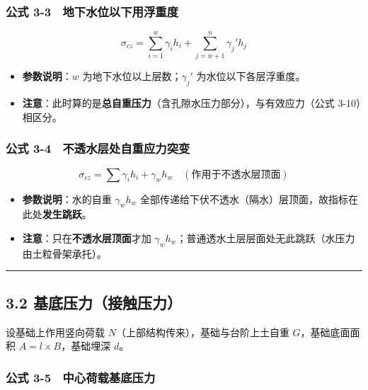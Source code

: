 \documentclass[
]{article}
\providecommand{\tightlist}{%
  \setlength{\itemsep}{0pt}\setlength{\parskip}{0pt}}
\begin{document}
\subsubsection{公式
3-3　地下水位以下用浮重度}\label{ux516cux5f0f-3-3-ux5730ux4e0bux6c34ux4f4dux4ee5ux4e0bux7528ux6d6eux91cdux5ea6}

\[\sigma_{cz}=\sum_{i=1}^{w}\gamma_i h_i+\sum_{j=w+1}^{n}\gamma_j' h_j\]

\begin{itemize}
\tightlist
\item
  \textbf{参数说明}：\(w\) 为地下水位以上层数；\(\gamma_j'\)
  为水位以下各层浮重度。
\item
  \textbf{注意}：此时算的是\textbf{总自重压力}（含孔隙水压力部分），与有效应力（公式
  3-10）相区分。
\end{itemize}

\subsubsection{公式
3-4　不透水层处自重应力突变}\label{ux516cux5f0f-3-4-ux4e0dux900fux6c34ux5c42ux5904ux81eaux91cdux5e94ux529bux7a81ux53d8}

\[\sigma_{cz}=\sum\gamma_i h_i+\gamma_w h_w\quad(\text{作用于不透水层顶面})\]

\begin{itemize}
\tightlist
\item
  \textbf{参数说明}：水的自重 \(\gamma_w h_w\)
  全部传递给下伏不透水（隔水）层顶面，故指标在此处\textbf{发生跳跃}。
\item
  \textbf{注意}：只在\textbf{不透水层顶面}才加
  \(\gamma_w h_w\)；普通透水土层层面处无此跳跃（水压力由土粒骨架承托）。
\end{itemize}

\begin{center}\rule{0.5\linewidth}{0.5pt}\end{center}

\subsection{3.2
基底压力（接触压力）}\label{ux57faux5e95ux538bux529bux63a5ux89e6ux538bux529b}

设基础上作用竖向荷载 \(N\)（上部结构传来），基础与台阶上土自重
\(G\)，基础底面面积 \(A=l\times B\)，基础埋深 \(d\)。

\subsubsection{公式
3-5　中心荷载基底压力}\label{ux516cux5f0f-3-5-ux4e2dux5fc3ux8377ux8f7dux57faux5e95ux538bux529b}
\end{document}
